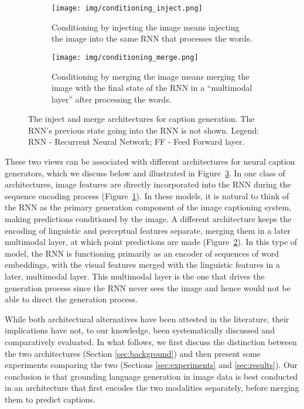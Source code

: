 \documentclass[11pt,letterpaper]{article}
\begin{document}
\begin{figure}[!h]
	\centering
	\begin{subfigure}{0.45\textwidth}
      \caption{
          \label{fig:conditioning_inject}
          Conditioning by injecting the image means injecting the image into the same RNN that processes the words.
      }
      \centering
      \texttt{[image: img/conditioning\_inject.png]}
	\end{subfigure}
	
    \vspace{10pt}
    
	\begin{subfigure}{0.45\textwidth}
      \caption{
          \label{fig:conditioning_merge}
          Conditioning by merging the image means merging the image with the final state of the RNN in a ``multimodal layer'' after processing the words.
      }
      \centering
      \texttt{[image: img/conditioning\_merge.png]}
    \end{subfigure}
	\caption{
		\label{fig:conditioning}
		The inject and merge architectures for caption generation. The RNN's previous state going into the RNN is not shown. Legend: RNN - Recurrent Neural Network; FF - Feed Forward layer.
	}
\end{figure}

These two views can be associated with different architectures for neural caption generators, which we discuss below and illustrated in Figure~\ref{fig:conditioning}. In one class of architectures, image features are directly incorporated into the RNN during the sequence encoding process (Figure~\ref{fig:conditioning_inject}). In these models, it is natural to think of the RNN as the primary generation component of the image captioning system, making predictions conditioned by the image. A different architecture keeps the encoding of linguistic and perceptual features separate, merging them in a later multimodal layer, at which point predictions are made (Figure~\ref{fig:conditioning_merge}). In this type of model, the RNN is functioning primarily as an encoder of sequences of word embeddings, with the visual features merged with the linguistic features in a later, multimodal layer. This multimodal layer is the one that drives the generation process since the RNN never sees the image and hence would not be able to direct the generation process.

While both architectural alternatives have been attested in the literature, their implications have not, to our knowledge, been systematically discussed and comparatively evaluated. In what follows, we first  discuss the distinction between the two architectures (Section \ref{sec:background}) and then present some experiments comparing the two (Sections \ref{sec:experiments} and \ref{sec:results}). Our conclusion is that grounding language generation in image data is best conducted in an architecture that first encodes the two modalities separately, before merging them to predict captions.
\end{document}

